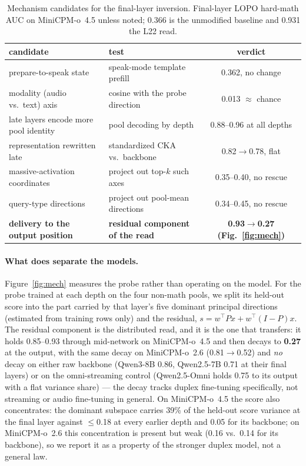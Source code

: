 \begin{table}[h]
\centering\footnotesize
\caption{Mechanism candidates for the final-layer inversion. Final-layer
LOPO hard-math AUC on MiniCPM-o~4.5 unless noted; 0.366 is the
unmodified baseline and 0.931 the L22 read.}
\label{tab:mech}
\begin{tabular}{llc}
\toprule
candidate & test & verdict \\
\midrule
prepare-to-speak state & speak-mode template prefill & 0.362, no change \\
modality (audio vs.\ text) axis & cosine with the probe direction & 0.013 $\approx$ chance \\
late layers encode more pool identity & pool decoding by depth & 0.88--0.96 at all depths \\
representation rewritten late & standardized CKA vs.\ backbone & 0.82$\to$0.78, flat \\
massive-activation coordinates & project out top-$k$ such axes & 0.35--0.40, no rescue \\
query-type directions & project out pool-mean directions & 0.34--0.45, no rescue \\
\midrule
\textbf{delivery to the output position} & \textbf{residual component of the read} & \textbf{0.93$\to$0.27 (Fig.~\ref{fig:mech})} \\
\bottomrule
\end{tabular}
\end{table}

\paragraph{What does separate the models.} Figure~\ref{fig:mech}
measures the probe rather than operating on the model. For the probe
trained at each depth on the four non-math pools, we split its
held-out score into the part carried by that layer's five dominant
principal directions (estimated from training rows only) and the
residual, $s = w^\top P x + w^\top (I-P) x$. The residual component is
the distributed read, and it is the one that transfers: it holds
0.85--0.93 through mid-network on MiniCPM-o~4.5 and then decays to
\textbf{0.27} at the output, with the same decay on MiniCPM-o~2.6
(0.81$\to$0.52) and \emph{no} decay on either raw backbone (Qwen3-8B
0.86, Qwen2.5-7B 0.71 at their final layers) or on the omni-streaming
control (Qwen2.5-Omni holds 0.75 to its output with a flat variance
share) --- the decay tracks duplex fine-tuning specifically, not
streaming or audio fine-tuning in general. On MiniCPM-o~4.5 the
score also concentrates: the dominant subspace carries 39\% of the
held-out score variance at the final layer against $\le$0.18 at every
earlier depth and 0.05 for its backbone; on MiniCPM-o~2.6 this
concentration is present but weak (0.16 vs.\ 0.14 for its backbone),
so we report it as a property of the stronger duplex model, not a
general law.

